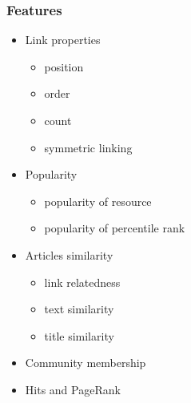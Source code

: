 \begin{frame}
  \frametitle{Features}
    \begin{itemize}
     \item Link properties
      \begin{itemize}
       \item position
       \item order
       \item count
       \item symmetric linking
      \end{itemize}
      
      \item Popularity 
      \begin{itemize}
       \item popularity of resource 
       \item popularity of percentile rank
      \end{itemize}
      
      \item Articles similarity
      \begin{itemize}
       \item link relatedness
       \item text similarity
       \item title similarity
      \end{itemize}

   \item Community membership
   \item Hits and PageRank

  \end{itemize}
\end{frame}


